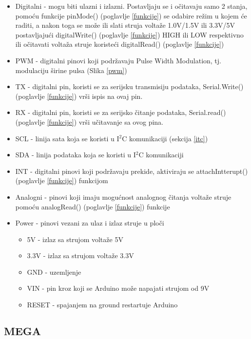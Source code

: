 \documentclass[../Document.tex]{subfiles}
\begin{document}
\begin{itemize}
  \item Digitalni - mogu biti ulazni i izlazni. Postavljaju se i očitavaju samo 2 stanja, pomoću funkcije pinMode() (poglavlje \ref{funkcije}) se odabire režim u kojem će raditi, a nakon toga se može ili slati struja voltaže 1.0V/1.5V ili 3.3V/5V postavljajući digitalWrite() (poglavlje \ref{funkcije}) HIGH ili LOW respektivno ili očitavati voltaža struje koristeći digitalRead() (poglavlje \ref{funkcije})
  \item PWM - digitalni pinovi koji podržavaju Pulse Width Modulation, tj. modulaciju širine pulsa (Slika \ref{pwm})
  \item TX - digitalni pin, koristi se za serijsku transmisiju podataka, Serial.Write()  (poglavlje \ref{funkcije}) vrši ispis na ovaj pin.
  \item RX - digitalni pin, koristi se za serijsko čitanje podataka, Serial.read() (poglavlje \ref{funkcije}) vrši učitavanje sa ovog pina.
  \item SCL - linija sata koja se koristi u I$^2$C komunikaciji (sekcija \ref{itc})
  \item SDA - linija podataka koja se koristi u I$^2$C komunikaciji
  \item INT - digitalni pinovi koji podržavaju prekide, aktiviraju se attachIntterupt() (poglavlje \ref{funkcije}) funkcijom
  \item Analogni - pinovi koji imaju mogućnost analognog čitanja voltaže struje pomoću analogRead() (poglavlje \ref{funkcije}) funkcije
  \item Power - pinovi vezani za ulaz i izlaz struje u ploči
        \begin{itemize}
          \item 5V - izlaz sa strujom voltaže 5V
          \item 3.3V - izlaz sa strujom voltaže 3.3V
          \item GND - uzemljenje
          \item VIN - pin kroz koji se Arduino može napajati strujom od 9V
          \item RESET - spajanjem na ground restartuje Arduino
        \end{itemize}
\end{itemize}

\subsection{MEGA}
\end{document}
